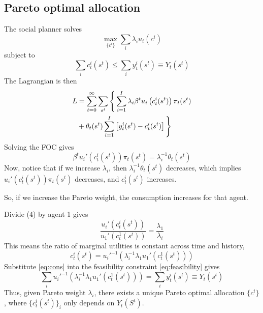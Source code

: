 \documentclass[twocolumn, fleqn]{article}
\numberwithin{equation}{section}
\begin{document}
	\subsection{Pareto optimal allocation}
	The social planner solves 
	\begin{equation}
		\max_{\{c^i\}} \sum_i \lambda_i u_i (c^i)
	\end{equation}
	subject to 
	\begin{equation}
		\sum_i c_t^i (s^t) \leq \sum_i y_t^i(s^t) \equiv Y_t (s^t) \label{eq:feasibility}
	\end{equation}
	The Lagrangian is then 
	\begin{align}
	L &= \sum_{t=0}^{\infty} \sum_{s^t} \Bigg\{ \sum_{i=1}^{I} \lambda_i \beta^t u_i\left(c_t^i(s^t)\right) \pi_t(s^t) \notag \\
		&+ \theta_t(s^t) \sum_{i=1}^{I} \left[ y_t^i(s^t) - c_t^i(s^t) \right] \Bigg\}
	\end{align}
	Solving the FOC gives
	\begin{equation}
		\beta^t u_i'\left(c_t^i(s^t)\right) \pi_t(s^t) = \lambda_i^{-1} \theta_t(s^t) \label{eq:simple_op}
	\end{equation}
	Now, notice that if we increase $\lambda_i$, then $\lambda_i^{-1} \theta_t(s^t)$ decreases, which implies $u_i'\left(c_t^i(s^t)\right) \pi_t(s^t)$ decreases, and $c_t^i(s^t)$ increases. 
	
	So, if we increase the Pareto weight, the consumption increases for that agent. 
	
	Divide (4) by agent 1 gives
	\begin{equation}
		\frac{u_i'\left(c_t^i(s^t)\right)}{u_1'\left(c_t^1(s^t)\right)} = \frac{\lambda_1}{\lambda_i}
	\end{equation}
	This means the ratio of marginal utilities is constant across time and history,
	\begin{equation}
		c_t^i(s^t) = {u_i'}^{-1} \left( \lambda_i^{-1} \lambda_1 u_1'\left(c_t^1(s^t)\right) \right) \label{eq:cons}
	\end{equation}
	Substitute \eqref{eq:cons} into the feasibility constraint \eqref{eq:feasibility} gives
	\begin{equation}
		\sum_i {u_i'}^{-1} \left( \lambda_i^{-1} \lambda_1 u_1'\left(c_t^1(s^t)\right) \right) = \sum_i y_t^i(s^t)\equiv Y_t (s^t)
	\end{equation}
	Thus, given Pareto weight $\lambda_i$, there exists a unique Pareto optimal allocation $\{c^i\}$, where $\{c_t^i(s^t)\}_i$ only depends on $Y_t(S^t)$.
	
\end{document}

